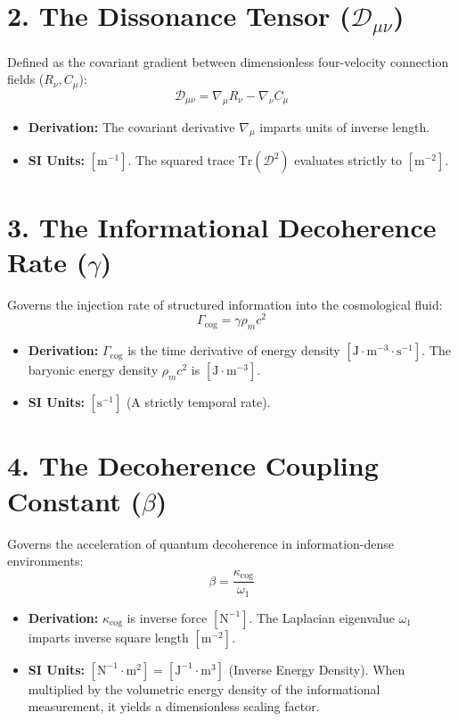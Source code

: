 \documentclass[12pt,openany]{book}
\theoremstyle{plain}
\theoremstyle{definition}
\theoremstyle{remark}
\begin{document}
\section*{2. The Dissonance Tensor ($\mathcal{D}_{\mu\nu}$)}
Defined as the covariant gradient between dimensionless four-velocity connection fields ($R_\nu, C_\mu$):
\[ \mathcal{D}_{\mu\nu} = \nabla_\mu R_\nu - \nabla_\nu C_\mu \]
\begin{itemize}
    \item \textbf{Derivation:} The covariant derivative $\nabla_\mu$ imparts units of inverse length.
    \item \textbf{SI Units:} $[\text{m}^{-1}]$. The squared trace $\text{Tr}(\mathcal{D}^2)$ evaluates strictly to $[\text{m}^{-2}]$.
\end{itemize}

\section*{3. The Informational Decoherence Rate ($\gamma$)}
Governs the injection rate of structured information into the cosmological fluid:
\[ \Gamma_{\text{cog}} = \gamma \rho_m c^2 \]
\begin{itemize}
    \item \textbf{Derivation:} $\Gamma_{\text{cog}}$ is the time derivative of energy density $[\text{J} \cdot \text{m}^{-3} \cdot \text{s}^{-1}]$. The baryonic energy density $\rho_m c^2$ is $[\text{J} \cdot \text{m}^{-3}]$.
    \item \textbf{SI Units:} $[\text{s}^{-1}]$ (A strictly temporal rate).
\end{itemize}

\section*{4. The Decoherence Coupling Constant ($\beta$)}
Governs the acceleration of quantum decoherence in information-dense environments:
\[ \beta = \frac{\kappa_{\text{cog}}}{\omega_1} \]
\begin{itemize}
    \item \textbf{Derivation:} $\kappa_{\text{cog}}$ is inverse force $[\text{N}^{-1}]$. The Laplacian eigenvalue $\omega_1$ imparts inverse square length $[\text{m}^{-2}]$.
    \item \textbf{SI Units:} $[\text{N}^{-1} \cdot \text{m}^2] = [\text{J}^{-1} \cdot \text{m}^3]$ (Inverse Energy Density). When multiplied by the volumetric energy density of the informational measurement, it yields a dimensionless scaling factor.
\end{itemize}
\end{document}
